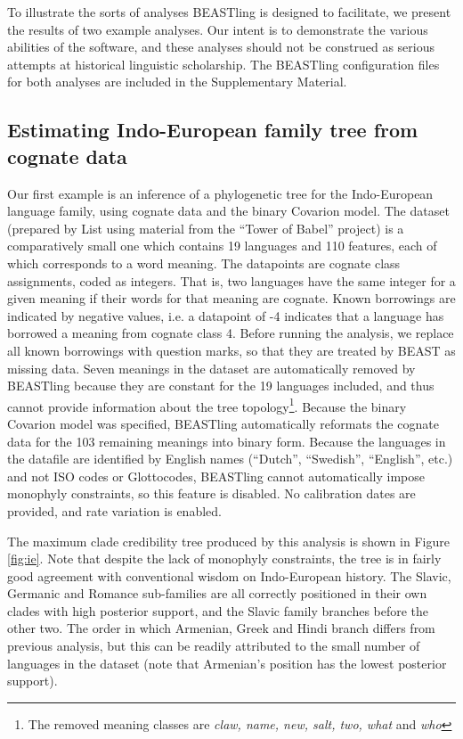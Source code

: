 \documentclass[twocolumn,10pt]{scrartcl}
\begin{document}
To illustrate the sorts of analyses BEASTling is designed to facilitate, we present the results of two example analyses.  Our intent is to demonstrate the various abilities of the software, and these analyses should not be construed as serious attempts at historical linguistic scholarship.  The BEASTling configuration files for both analyses are included in the Supplementary Material.

\subsection{Estimating Indo-European family tree from cognate data}

Our first example is an inference of a phylogenetic tree for the Indo-European language family, using cognate data and the binary Covarion model.  The dataset\cite{List2014a} (prepared by List\cite{List2014} using material from the ``Tower of Babel'' project\cite{Starostin2008}) is a comparatively small one which contains 19 languages and 110 features, each of which corresponds to a word meaning.  The datapoints are cognate class assignments, coded as integers.  That is, two languages have the same integer for a given meaning if their words for that meaning are cognate.  Known borrowings are indicated by negative values, i.e. a datapoint of -4 indicates that a language has borrowed a meaning from cognate class 4.  Before running the analysis, we replace all known borrowings with question marks, so that they are treated by BEAST as missing data.  Seven meanings in the dataset are automatically removed by BEASTling because they are constant for the 19 languages included, and thus cannot provide information about the tree topology\footnote{The removed meaning classes are \emph{claw, name, new, salt, two, what} and \emph{who}}.  Because the binary Covarion model was specified, BEASTling automatically reformats the cognate data for the 103 remaining meanings into binary form.  Because the languages in the datafile are identified by English names (``Dutch'', ``Swedish'', ``English'', etc.) and not ISO codes or Glottocodes, BEASTling cannot automatically impose monophyly constraints, so this feature is disabled.  No calibration dates are provided, and rate variation is enabled.

The maximum clade credibility tree produced by this analysis is shown in Figure \ref{fig:ie}.  Note that despite the lack of monophyly constraints, the tree is in fairly good agreement with conventional wisdom on Indo-European history.  The Slavic, Germanic and Romance sub-families are all correctly positioned in their own clades with high posterior support, and the Slavic family branches before the other two.  The order in which Armenian, Greek and Hindi branch differs from previous analysis\cite{Gray2003,Bouckaert2012}, but this can be readily attributed to the small number of languages in the dataset (note that Armenian's position has the lowest posterior support).
\end{document}
